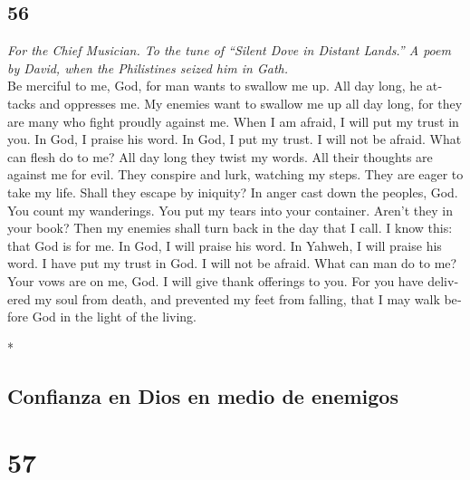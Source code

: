 \begin{paracol}{2}
\begin{otherlanguage}{english}
\hypertarget{section-111}{%
\section{56}\label{section-111}}

\emph{For the Chief Musician. To the tune of ``Silent Dove in Distant
Lands.'' A poem by David, when the Philistines seized him in Gath.}\\
 Be merciful to me, God, for man wants to swallow me up.
All day long, he attacks and oppresses me.  My enemies
want to swallow me up all day long, for they are many who fight proudly
against me.  When I am afraid, I will put my trust in you.
 In God, I praise his word. In God, I put my trust. I will
not be afraid. What can flesh do to me?  All day long they
twist my words. All their thoughts are against me for evil.
 They conspire and lurk, watching my steps. They are eager
to take my life.  Shall they escape by iniquity? In anger
cast down the peoples, God.  You count my wanderings. You
put my tears into your container. Aren't they in your book?
 Then my enemies shall turn back in the day that I call. I
know this: that God is for me.  In God, I will praise his
word. In Yahweh, I will praise his word.  I have put my
trust in God. I will not be afraid. What can man do to me?
 Your vows are on me, God. I will give thank offerings to
you.  For you have delivered my soul from death, and
prevented my feet from falling, that I may walk before God in the light
of the living.

\end{otherlanguage}

\switchcolumn[0]*

\hypertarget{confianza-en-dios-en-medio-de-enemigos}{%
\subsection{Confianza en Dios en medio de
enemigos}\label{confianza-en-dios-en-medio-de-enemigos}}

\hypertarget{section-112}{%
\section{57}\label{section-112}}


\end{paracol}
